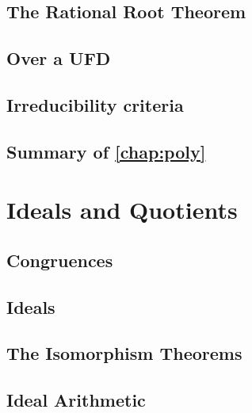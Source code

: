 \documentclass{memoir}
\begin{document}
    \section{The Rational Root Theorem}
      \label{sec:rat-root-thm}
      
      \newpage

    \section{Over a UFD}
      
      \newpage

    \section{Irreducibility criteria}
      \newpage

    \section*{Summary of \autoref{chap:poly}}
      


  \chapter{Ideals and Quotients}
    \label{chap:quot}
    \newpage

    \section{Congruences}
      \label{sec:congruence}
      
      \newpage

    \section{Ideals}
      \label{sec:ideals}
      
      \newpage

    \section{The Isomorphism Theorems}
      \label{sec:iso-thms}
      
      \newpage

    \section{Ideal Arithmetic}
      \label{sec:ideal-lattice}
      
      \newpage
\end{document}
